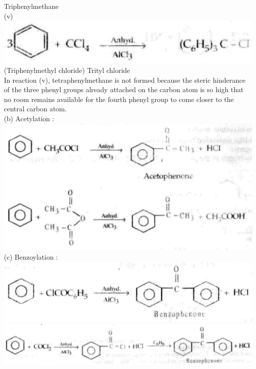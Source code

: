 \documentclass[10pt]{article}
\begin{document}
Triphenylmethane\\
(v)\\
\includegraphics[max width=\textwidth, center]{2025_01_28_8470952b98110cec3aabg-209(1)}\\
(Triphenylmethyl chloride) Trityl chloride\\
In reaction (v), tetraphenylmethane is not formed because the steric hinderance of the three phenyl groups already attached on the carbon atom is so high that no room remains available for the fourth phenyl group to come closer to the central carbon atom.\\
(b) Acetylation :\\
\includegraphics[max width=\textwidth, center]{2025_01_28_8470952b98110cec3aabg-209(3)}\\
(c) Benzoylation :\\
\includegraphics[max width=\textwidth, center]{2025_01_28_8470952b98110cec3aabg-209(4)}\\
\includegraphics[max width=\textwidth, center]{2025_01_28_8470952b98110cec3aabg-209(2)}
\end{document}
